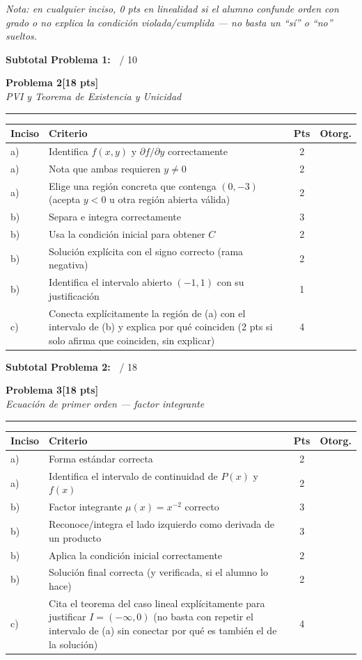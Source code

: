 \documentclass[11pt,letterpaper]{article}
\makeatletter
\newcommand{\problema}[3]{%
  \bigskip\bigskip\noindent
  {\Large\textbf{Problema #1}}\hfill\textbf{[#2 pts]}\\[3pt]
  {\small\itshape #3}\par
  \vspace{2pt}\hrule\vspace{8pt}
}
\newenvironment{tablarubrica}{%
  \begin{tabular}{@{}p{1.1cm}Lcc@{}}
  \toprule
  \textbf{Inciso} & \textbf{Criterio} & \textbf{Pts} & \textbf{Otorg.} \\
  \midrule
}{%
  \bottomrule
  \end{tabular}
}
\makeatother
\begin{document}
\textit{Nota: en cualquier inciso, 0 pts en linealidad si el alumno confunde orden con grado o no explica la condición violada/cumplida — no basta un ``sí'' o ``no'' sueltos.}

\medskip
\noindent\textbf{Subtotal Problema 1:\ } \underline{\hspace{2.5cm}} / 10

\newpage
\problema{2}{18}{PVI y Teorema de Existencia y Unicidad}

\begin{tablarubrica}
a) & Identifica $f(x,y)$ y $\partial f/\partial y$ correctamente & 2 & \\
a) & Nota que ambas requieren $y\neq0$ & 2 & \\
a) & Elige una región concreta que contenga $(0,-3)$ (acepta $y<0$ u otra región abierta válida) & 2 & \\
b) & Separa e integra correctamente & 3 & \\
b) & Usa la condición inicial para obtener $C$ & 2 & \\
b) & Solución explícita con el signo correcto (rama negativa) & 2 & \\
b) & Identifica el intervalo abierto $(-1,1)$ con su justificación & 1 & \\
c) & Conecta explícitamente la región de (a) con el intervalo de (b) y explica por qué coinciden (2 pts si solo afirma que coinciden, sin explicar) & 4 & \\
\end{tablarubrica}

\medskip
\noindent\textbf{Subtotal Problema 2:\ } \underline{\hspace{2.5cm}} / 18

\problema{3}{18}{Ecuación de primer orden --- factor integrante}

\begin{tablarubrica}
a) & Forma estándar correcta & 2 & \\
a) & Identifica el intervalo de continuidad de $P(x)$ y $f(x)$ & 2 & \\
b) & Factor integrante $\mu(x)=x^{-2}$ correcto & 3 & \\
b) & Reconoce/integra el lado izquierdo como derivada de un producto & 3 & \\
b) & Aplica la condición inicial correctamente & 2 & \\
b) & Solución final correcta (y verificada, si el alumno lo hace) & 2 & \\
c) & Cita el teorema del caso lineal explícitamente para justificar $I=(-\infty,0)$ (no basta con repetir el intervalo de (a) sin conectar por qué es también el de la solución) & 4 & \\
\end{tablarubrica}
\end{document}
